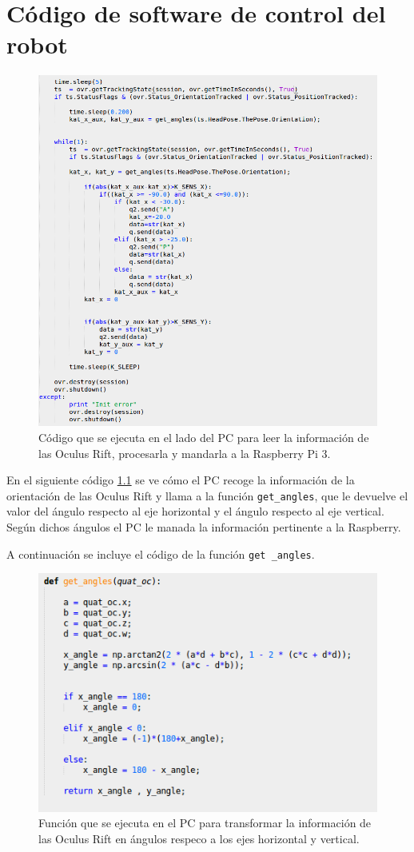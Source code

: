 \documentclass[twoside, 11pt]{epstfg}
\begin{document}
\chapter{Código de software de control del robot}
\vspace*{-4cm}
\begin{figure}[H]
	\centerline{
		\mbox{\includegraphics[width=.70\textwidth]{images/codigoOrdenador.png}}
	}
	\caption{Código que se ejecuta en el lado del PC para leer la información de las Oculus Rift, procesarla y mandarla a la Raspberry Pi 3.}
	\label{CodOrdenador}
\end{figure}

En el siguiente código \ref{CodOrdenador} se ve cómo el PC recoge la información de la orientación de las Oculus Rift y llama a la función \texttt{get\_angles}, que le devuelve el valor del ángulo respecto al eje horizontal y el ángulo respecto al eje vertical. Según dichos ángulos el PC le manada la información pertinente a la Raspberry.

A continuación se incluye el código de la función \texttt{get \_angles}.
\begin{figure}[H]
	\centerline{
		\mbox{\includegraphics[width=.70\textwidth]{images/getAngles.png}}
	}
	\caption{Función que se ejecuta en el PC para transformar la información de las Oculus Rift en ángulos respeco a los ejes horizontal y vertical.}
	\label{CodAngle}
\end{figure}
\end{document}
